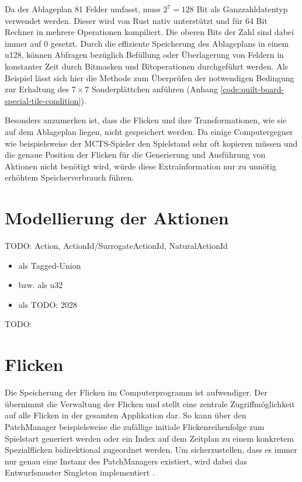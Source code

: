 Da der Ablageplan 81 Felder umfasst, muss $2^7=128$ Bit als Ganzzahldatentyp verwendet werden. Dieser wird von Rust nativ unterstützt und für 64 Bit Rechner in mehrere Operationen kompiliert. Die oberen Bits der Zahl sind dabei immer auf 0 gesetzt. Durch die effiziente Speicherung des Ablageplans in einem \ac{u128}, können Abfragen bezüglich Befüllung oder Überlagerung von Feldern in konstanter Zeit durch Bitmasken und Bitoperationen durchgeführt werden. Als Beispiel lässt sich hier die Methode zum Überprüfen der notwendigen Bedingung zur Erhaltung des $7\times 7$ Sonderplättchen anführen (Anhang \ref{code:quilt-board-special-tile-condition}).

Besonders anzumerken ist, dass die Flicken und ihre Transformationen, wie sie auf dem Ablageplan liegen, nicht gespeichert werden. Da einige Computergegner wie beispielsweise der \ac{MCTS}-Spieler den Spielstand sehr oft kopieren müssen und die genaue Position der Flicken für die Generierung und Ausführung von Aktionen nicht benötigt wird, würde diese Extrainformation nur zu unnötig erhöhtem Speicherverbrauch führen.

\section{Modellierung der Aktionen}

TODO: Action, ActionId/SurrogateActionId, NaturalActionId

\begin{itemize}
    \item {} als Tagged-Union
    \item {} bzw.  als \ac{u32}
    \item {} als TODO: 2028
\end{itemize}

TODO:



\section{Flicken}

Die Speicherung der Flicken im Computerprogramm ist aufwendiger. Der  übernimmt die Verwaltung der Flicken und stellt eine zentrale Zugriffmöglichkeit auf alle Flicken in der gesamten Applikation dar. So kann über den PatchManager beispielsweise die zufällige initiale Flickenreihenfolge zum Spielstart generiert werden oder ein Index auf dem Zeitplan zu einem konkretem Spezialflicken bidirektional zugeordnet werden. Um sicherzustellen, dass es immer nur genau eine Instanz des PatchManagers existiert, wird dabei das Entwurfsmuster Singleton implementiert \cite[S. 127]{2000.Gamma}.

